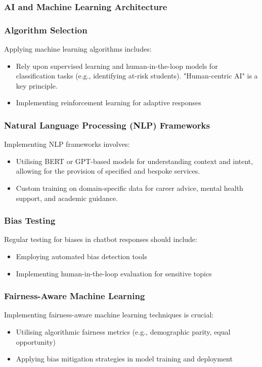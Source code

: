 \documentclass[14pt,a4paper]{article}
\begin{document}
\begin{multicols}{2}
\subsubsection{AI and Machine Learning Architecture}

\subsubsection*{Algorithm Selection}
Applying machine learning algorithms \textit{\parencite[pp. 25-50]{Geron2024}} includes:
\begin{itemize}
    \item Rely upon supervised learning and human-in-the-loop models for classification tasks (e.g., identifying at-risk students). "Human-centric AI" is a key principle.
    \item Implementing reinforcement learning for adaptive responses
\end{itemize}
\subsubsection*{Natural Language Processing (NLP) Frameworks}
Implementing NLP frameworks \textit{\parencite[pp. 1-15]{JurafskyMartin2024}} involves:
\begin{itemize}
    \item Utilising BERT or GPT-based models for understanding context and intent, allowing for the provision of specified and bespoke services.
    \item Custom training on domain-specific data for career advice, mental health support, and academic guidance.
\end{itemize}

\subsubsection{Bias Testing}
Regular testing for biases in chatbot responses \textit{\parencite{ACMFAccT2024}} should include:
\begin{itemize}
    \item Employing automated bias detection tools
    \item Implementing human-in-the-loop evaluation for sensitive topics
\end{itemize}

\subsubsection{Fairness-Aware Machine Learning}
Implementing fairness-aware machine learning techniques \textit{\parencite{Barocas2021}} is crucial:
\begin{itemize}
    \item Utilising algorithmic fairness metrics (e.g., demographic parity, equal opportunity)
    \item Applying bias mitigation strategies in model training and deployment
\end{itemize}


\end{multicols}
\end{document}
